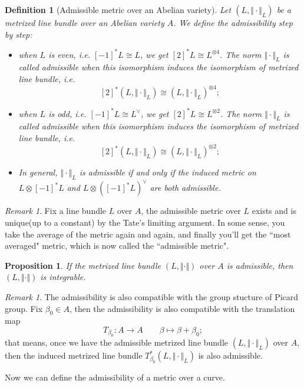 \documentclass[reqno,11pt]{amsart}
\numberwithin{equation}{section}
\theoremstyle{plain}
\newtheorem{proposition}[theorem]{Proposition}
\newtheorem{defn}[theorem]{Definition}
\theoremstyle{plain}
\numberwithin{equation}{section}
\theoremstyle{remark}
\newtheorem{remark}[theorem]{Remark}
\newcommand{\norm}[1]{\Vert{#1}\Vert}
\begin{document}
\begin{defn}[Admissible metric over an Abelian variety]
Let $(L,\norm{\cdot}_L)$ be a metrized line bundle over an Abelian variety $A$. We define the admissibility step by step:
\begin{itemize}
\item  when $L$ is even, i.e. $[-1]^*L\cong L$, we get $[2]^*L\cong L^{\otimes 4}$. The norm $\norm{\cdot}_L$ is called admissible when this isomorphism induces the isomorphism of metrized line bundle, i.e.
$$[2]^*(L,\norm{\cdot}_L)\cong (L,\norm{\cdot}_L)^{\otimes 4};$$ 
\item  when $L$ is odd, i.e. $[-1]^*L\cong L^{\vee}$, we get $[2]^*L\cong L^{\otimes 2}$. The norm $\norm{\cdot}_L$ is called admissible when this isomorphism induces the isomorphism of metrized line bundle, i.e.
$$[2]^*(L,\norm{\cdot}_L)\cong (L,\norm{\cdot}_L)^{\otimes 2};$$ 
\item In general, $\norm{\cdot}_L$ is admissible if and only if the induced metric on $L \otimes [-1]^*L$ and $L \otimes ([-1]^*L)^{\vee}$ are both admissible.
\end{itemize}
\end{defn}
\begin{remark}
Fix a line bundle $L$ over $A$, the admissible metric over $L$ exists and is unique(up to a constant) by the Tate's limiting argument. In some sense, you take the average of the metric again and again, and finally you'll get the ``most averaged" metric, which is now called the ``admissible metric".
\end{remark}
\begin{proposition}
If the metrized line bundle $(L,\norm{\cdot})$ over $A$ is admissible, then $(L,\norm{\cdot})$ is integrable.
\end{proposition}
\begin{remark}
The admissibility is also compatible with the group stucture of Picard group. Fix $\beta_0 \in A$, then the admissibility is also compatible with the translation map
$$T_{\beta_0}: A\longrightarrow A \qquad \beta \longmapsto \beta+\beta_0;$$
that means, once we have the admissible metrized line bundle $(L,\norm{\cdot}_L)$ over $A$, then the induced metrized line bundle $T_{\beta_0}^{*}(L,\norm{\cdot}_L)$ is also admissible.
\end{remark}
Now we can define the admissibility of a metric over a curve.
\end{document}
